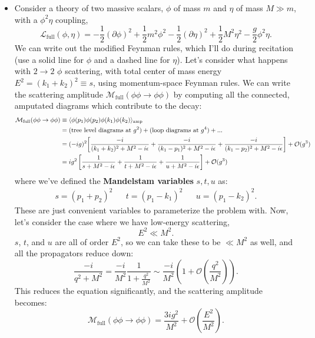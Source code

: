 \documentclass[12pt, oneside]{article}   	%
\theoremstyle{definition}
\begin{document}
\begin{itemize}

	\item Consider a theory of two massive scalars, $\phi$ of mass $m$ and $\eta$ of mass $M\gg m$, with a $\phi^2\eta$ coupling,
	\begin{equation}
		\mathcal L_\mathrm{full}(\phi, \eta) = -\frac{1}{2}(\partial\phi)^2 + \frac{1}{2} m^2\phi^2 -\frac{1}{2}(\partial\eta)^2 + \frac{1}{2} M^2\eta^2 - \frac{g}{2} \phi^2 \eta.
	\end{equation}
	We can write out the modified Feynman rules, which I'll do during recitation (use a solid line for $\phi$ and a dashed line for $\eta$). Let's consider what happens with $2\rightarrow 2$ $\phi$ scattering, with total center of mass energy $E^2 = (k_1 + k_2)^2\equiv s$, using momentum-space Feynman rules. We can write the scattering amplitude $\mathcal M_\mathrm{full}(\phi\phi\rightarrow\phi\phi)$ by computing all the connected, amputated diagrams which contribute to the decay:
	\begin{align}\begin{split}
		\mathcal M_\mathrm{full}(\phi\phi\rightarrow\phi\phi)&\equiv \langle\phi(p_1) \phi(p_2)\phi(k_1) \phi(k_2)\rangle_\mathrm{amp} \\
		&= (\textnormal{tree level diagrams at } g^2) + (\textnormal{loop diagrams at } g^4) + ... \\
		&= (-ig)^2 \bigg[\frac{-i}{(k_1 + k_2)^2 + M^2 - i\epsilon} + \frac{-i}{(k_1 - p_1)^2 + M^2 - i\epsilon} + \frac{-i}{(k_1 - p_2)^2 + M^2 - i\epsilon}\bigg] + \mathcal O(g^3) \\
		&= ig^2\left[\frac{1}{s + M^2 -i\epsilon } + \frac{1}{t + M^2-i\epsilon } + \frac{1}{u + M^2 -i\epsilon } \right] + \mathcal O(g^3)
	\end{split}\end{align}
	where we've defined the \textbf{Mandelstam variables} $s, t, u$ as:
	\begin{align} 
		s = (p_1 + p_2)^2 &&
		t = (p_1 - k_1)^2 &&
		u = (p_1 - k_2)^2.
	\end{align}
	These are just convenient variables to parameterize the problem with. Now, let's consider the case where we have low-energy scattering,
	\begin{equation}
		E^2\ll M^2. 
	\end{equation}
	$s$, $t$, and $u$ are all of order $E^2$, so we can take these to be $\ll M^2$ as well, and all the propagators reduce down:
	\begin{equation}
		\frac{-i}{q^2 + M^2} = \frac{-i}{M^2}\frac{1}{1 + \frac{q^2}{M^2}}\sim  \frac{-i}{M^2} \left(1 + \mathcal O\left(\frac{q^2}{M^2}\right) \right).
	\end{equation}
	This reduces the equation significantly, and the scattering amplitude becomes:
	\begin{equation}
		\mathcal M_\mathrm{full}(\phi\phi\rightarrow\phi\phi) = \frac{3ig^2}{M^2} + \mathcal O\left(\frac{E^2}{M^2}\right).
	\end{equation}
	

\end{itemize}
\end{document}
